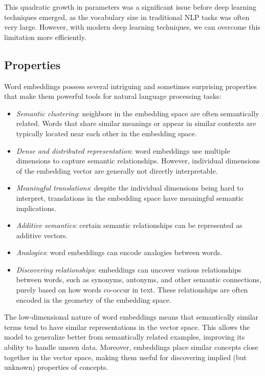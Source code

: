 This quadratic growth in parameters was a significant issue before deep learning techniques emerged, as the vocabulary size in traditional NLP tasks was often very large. 
However, with modern deep learning techniques, we can overcome this limitation more efficiently.

\subsection{Properties}
Word embeddings possess several intriguing and sometimes surprising properties that make them powerful tools for natural language processing tasks:
\begin{itemize}
    \item \textit{Semantic clustering}: neighbors in the embedding space are often semantically related. 
        Words that share similar meanings or appear in similar contexts are typically located near each other in the embedding space.
    \item \textit{Dense and distributed representation}: word embeddings use multiple dimensions to capture semantic relationships. 
        However, individual dimensions of the embedding vector are generally not directly interpretable.
    \item \textit{Meaningful translations}: despite the individual dimensions being hard to interpret, translations in the embedding space have meaningful semantic implications. 
    \item \textit{Additive semantics}: certain semantic relationships can be represented as additive vectors. 
    \item \textit{Analogies}: word embeddings can encode analogies between words. 
    \item \textit{Discovering relationships}: embeddings can uncover various relationships between words, such as synonyms, antonyms, and other semantic connections, purely based on how words co-occur in text. 
        These relationships are often encoded in the geometry of the embedding space.
\end{itemize}
\noindent The low-dimensional nature of word embeddings means that semantically similar terms tend to have similar representations in the vector space. 
This allows the model to generalize better from semantically related examples, improving its ability to handle unseen data. 
Moreover, embeddings place similar concepts close together in the vector space, making them useful for discovering implied (but unknown) properties of concepts. 

